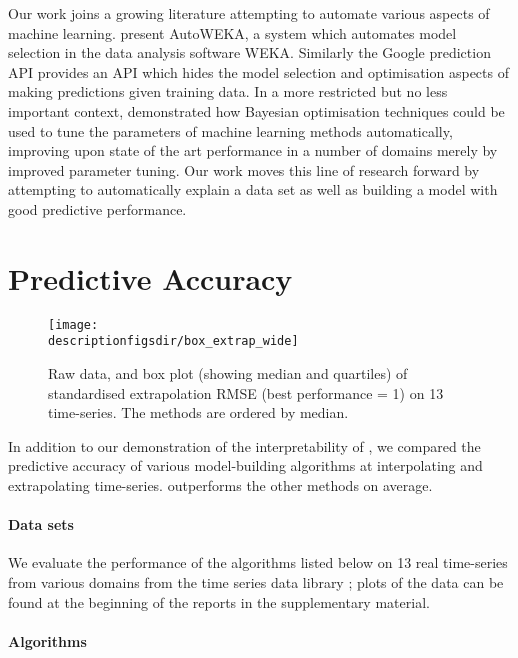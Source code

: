 Our work joins a growing literature attempting to automate various aspects of machine learning.
\citet{Thornton2013-zg} present AutoWEKA, a system which automates model selection in the data analysis software WEKA.
Similarly the Google prediction API \citep{green2011prediction} provides an API which hides the model selection and optimisation aspects of making predictions given training data.
In a more restricted but no less important context, \citet{Snoek2012-ri} demonstrated how Bayesian optimisation techniques could be used to tune the parameters of machine learning methods automatically, improving upon state of the art performance in a number of domains merely by improved parameter tuning.
Our work moves this line of research forward by attempting to automatically explain a data set as well as building a model with good predictive performance.

\section{Predictive Accuracy}
\label{sec:numerical}

\begin{figure*}[ht]
\centering
\texttt{[image: \\descriptionfigsdir/box\_extrap\_wide]}
\vspace{-0.8cm}
\caption[RMSE comparison of \procedurename{} and other algorithms at extrapolation.]{
Raw data, and box plot (showing median and quartiles) of standardised extrapolation RMSE (best performance = 1) on 13 time-series.
The methods are ordered by median.
}
\label{fig:box_extrap_dist}
\end{figure*}

In addition to our demonstration of the interpretability of \procedurename{}, we compared the predictive accuracy of various model-building algorithms at interpolating and extrapolating time-series.
\procedurename{} outperforms the other methods on average.

\paragraph{Data sets}

We evaluate the performance of the algorithms listed below on 13 real time-series from various domains from the time series data library \citep{Hyndman_undated-zj}; plots of the data can be found at the beginning of the reports in the supplementary material.

\paragraph{Algorithms}

